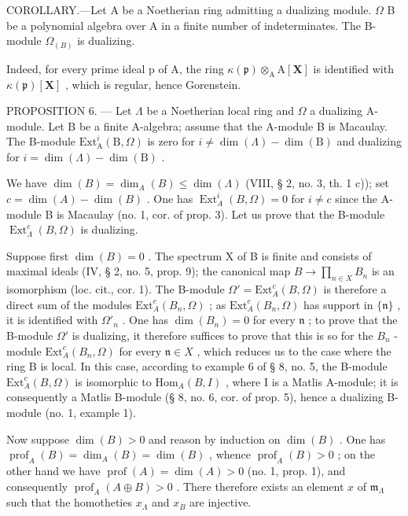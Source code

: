 COROLLARY.---Let A be a Noetherian ring admitting a dualizing module. \(\Omega\) B be a polynomial algebra over A in a finite number of indeterminates. The B-module \(\Omega_{(B)}\) is dualizing.

Indeed, for every prime ideal p of A, the ring \(\kappa(\mathfrak{p})\otimes_{\mathrm{A}}\mathrm{A}[\mathbf{X}]\) is identified with \(\kappa(\mathfrak{p})[\mathbf{X}]\) , which is regular, hence Gorenstein.

PROPOSITION 6. — Let \(\Lambda\) be a Noetherian local ring and \(\Omega\) a dualizing A-module. Let B be a finite A-algebra; assume that the A-module B is Macaulay. The B-module \(\mathrm{Ext}_{\mathrm{A}}^{i}(\mathrm{B},\Omega)\) is zero for \(i\neq \dim (\Lambda) - \dim (\mathrm{B})\) and dualizing for \(i = \dim (\Lambda) - \dim (\mathrm{B})\) .

We have \(\dim(B) = \dim_{A}(B) \leqslant \dim(\Lambda)\) (VIII, § 2, no. 3, th. 1 c)); set \(c = \dim(A) - \dim(B)\) . One has \(\operatorname{Ext}_{A}^{i}(B, \Omega) = 0\) for \(i \neq c\) since the A-module B is Macaulay (no. 1, cor. of prop. 3). Let us prove that the B-module \(\operatorname{Ext}_{\Lambda}^{c}(B, \Omega)\) is dualizing.

Suppose first \(\dim(B) = 0\) . The spectrum X of B is finite and consists of maximal ideals (IV, § 2, no. 5, prop. 9); the canonical map \(B \to \prod_{n \in X} B_n\) is an isomorphism (loc. cit., cor. 1). The B-module \(\Omega' = \text{Ext}_A^c(B, \Omega)\) is therefore a direct sum of the modules \(\text{Ext}_A^c(B_n, \Omega)\) ; as \(\text{Ext}_A^c(B_n, \Omega)\) has support in \(\{\mathfrak{n}\}\) , it is identified with \(\Omega'_n\) . One has \(\dim(B_n) = 0\) for every \(\mathfrak{n}\) ; to prove that the B-module \(\Omega'\) is dualizing, it therefore suffices to prove that this is so for the \(B_n\) -module \(\text{Ext}_A^c(B_n, \Omega)\) for every \(\mathfrak{n} \in X\) , which reduces us to the case where the ring B is local. In this case, according to example 6 of § 8, no. 5, the B-module \(\text{Ext}_A^c(B, \Omega)\) is isomorphic to \(\text{Hom}_A(B, I)\) , where I is a Matlis A-module; it is consequently a Matlis B-module (§ 8, no. 6, cor. of prop. 5), hence a dualizing B-module (no. 1, example 1).

Now suppose \(\dim(B) > 0\) and reason by induction on \(\dim(B)\) . One has \(\operatorname{prof}_{A}(B) = \dim_{A}(B) = \dim(B)\) , whence \(\operatorname{prof}_{A}(B) > 0\) ; on the other hand we have \(\operatorname{prof}(A) = \dim(A) > 0\) (no. 1, prop. 1), and consequently \(\operatorname{prof}_{A}(A \oplus B) > 0\) . There therefore exists an element \(x\) of \(\mathfrak{m}_{\Lambda}\) such that the homotheties \(x_{\Lambda}\) and \(x_{B}\) are injective.

